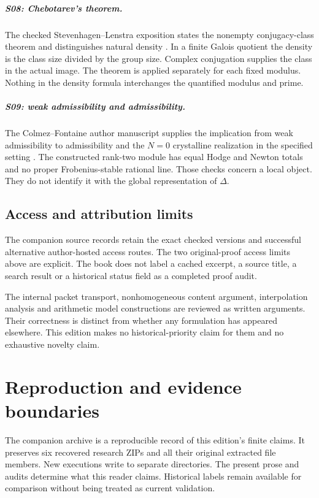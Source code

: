 \paragraph{S08: Chebotarev's theorem.}
The checked Stevenhagen--Lenstra exposition states the nonempty conjugacy-class theorem and distinguishes natural density \cite{Chebotarev}. In a finite Galois quotient the density is the class size divided by the group size. Complex conjugation supplies the class in the actual image. The theorem is applied separately for each fixed modulus. Nothing in the density formula interchanges the quantified modulus and prime.

\paragraph{S09: weak admissibility and admissibility.}
The Colmez--Fontaine author manuscript supplies the implication from weak admissibility to admissibility and the $N=0$ crystalline realization in the specified setting \cite{CF}. The constructed rank-two module has equal Hodge and Newton totals and no proper Frobenius-stable rational line. Those checks concern a local object. They do not identify it with the global representation of $\Delta$.

\section{Access and attribution limits}
The companion source records retain the exact checked versions and successful alternative author-hosted access routes. The two original-proof access limits above are explicit. The book does not label a cached excerpt, a source title, a search result or a historical status field as a completed proof audit.

The internal packet transport, nonhomogeneous content argument, interpolation analysis and arithmetic model constructions are reviewed as written arguments. Their correctness is distinct from whether any formulation has appeared elsewhere. This edition makes no historical-priority claim for them and no exhaustive novelty claim.

\chapter{Reproduction and evidence boundaries}\label{app:reproduction}

The companion archive is a reproducible record of this edition's finite claims. It preserves six recovered research ZIPs and all their original extracted file members. New executions write to separate directories. The present prose and audits determine what this reader claims. Historical labels remain available for comparison without being treated as current validation.


